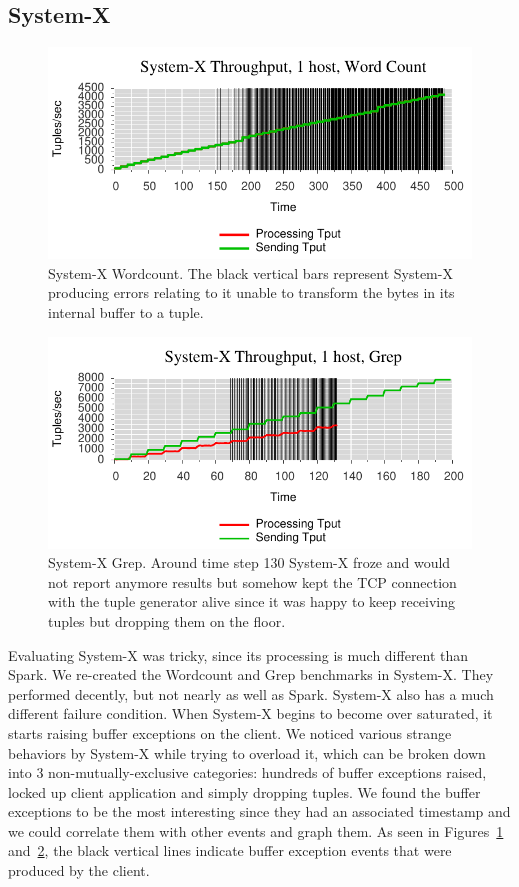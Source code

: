 \subsection{System-X}
\label{ssec:sysx1}

\begin{figure}[t]
\centering
\includegraphics[width=1\linewidth]{figures/sb1_tput.pdf}
\caption{System-X Wordcount. The black vertical bars represent System-X producing errors relating to it unable to transform the bytes in its internal buffer to a tuple.}
\label{fig:sb1-tput}
\end{figure}

\begin{figure}[t]
\centering
\includegraphics[width=1\linewidth]{figures/sb2_tput.pdf}
\caption{System-X Grep. Around time step 130 System-X froze and would not report anymore results but somehow kept the TCP connection with the tuple generator alive since it was happy to keep receiving tuples but dropping them on the floor.}
\label{fig:sb2-tput}
\end{figure}

Evaluating System-X was tricky, since its processing is much different than
Spark. We re-created the Wordcount and Grep benchmarks in System-X.  They
performed decently, but not nearly as well as Spark. System-X also has a much
different failure condition. When System-X begins to become over saturated, it
starts raising buffer exceptions on the client. We noticed various strange behaviors
by System-X while trying to overload it, which can be broken down into 3
non-mutually-exclusive categories: hundreds of buffer exceptions raised, locked
up client application and simply dropping tuples. We found the buffer
exceptions to be the most interesting since they had an associated timestamp
and we could correlate them with other events and graph them. As seen in 
Figures~\ref{fig:sb1-tput} and~\ref{fig:sb2-tput}, the black vertical lines
indicate buffer exception events that were produced by the client.

